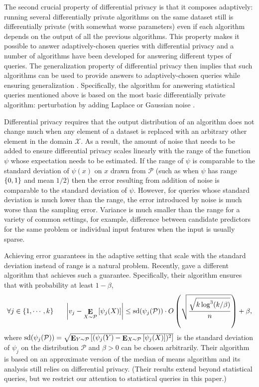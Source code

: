 \documentclass[final,12pt]{colt2018}
\newcommand{\ex}[2]{{\ifx&#1& \E \else \E_{#1} \fi \left[#2\right]}}
\newcommand{\sdv}{\mathop{\mathrm{sd}}}
\providecommand\X{\mathcal{X}}
\providecommand{\cP}{{\mathcal P}}
\begin{document}
The second crucial property of differential privacy is that it composes adaptively: running several differentially private algorithms on the same dataset still is differentially private (with somewhat worse parameters) even if each algorithm depends on the output of all the previous algorithms. This property makes it possible to answer adaptively-chosen queries with differential privacy and a number of algorithms have been developed for answering different types of queries. The generalization property of differential privacy then implies that such algorithms can be used to provide answers to adaptively-chosen queries while ensuring generalization \citep{DworkFHPRR14:arxiv}. Specifically, the algorithm for answering statistical queries mentioned above is based on the most basic differentially private algorithm: perturbation by adding Laplace or Gaussian noise \citep{DworkMNS:06}.

Differential privacy requires that the output distribution of an algorithm does not change much when any element of a dataset is replaced with an arbitrary other element in the domain $\X$. As a result, the amount of noise that needs to be added to ensure differential privacy scales linearly with the range of the function $\psi$ whose expectation needs to be estimated. If the range of $\psi$ is comparable to the standard deviation of $\psi(x)$ on $x$ drawn from $\cP$ (such as when $\psi$ has range $\{0,1\}$ and mean $1/2$) then the error resulting from addition of noise is comparable to the standard deviation of $\psi$. However, for queries whose standard deviation is much lower than the range, the error introduced by noise is much worse than the sampling error. Variance is much smaller than the range for a variety of common settings, for example, difference between candidate predictors for the same problem or individual input features when the input is usually sparse.

Achieving error guarantees in the adaptive setting that scale with the standard deviation instead of range is a natural problem. Recently, \citet{FeldmanS17}
gave a different algorithm that achieves such a guarantee. Specifically, their algorithm ensures that with probability at least $1-\beta$, \begin{equation}\forall j \in \{1, \cdots, k\} ~~~~~ \left| v_j - \ex{X \sim \cP}{\psi_j(X)} \right| \leq \sdv(\psi_j(\cP)) \cdot O \left( \sqrt{\frac{\sqrt{k \log^3 (k/\beta)}}{n}} \right) + \beta,\label{eqn:sdv}\end{equation} where $\sdv(\psi_j(\cP)) = \sqrt{\ex{Y \sim \cP}{(\psi_j(Y)-\ex{X \sim \cP}{\psi_j(X)})^2}}$ is the standard deviation of $\psi_j$ on the distribution $\cP$ and $\beta>0$ can be chosen arbitrarily.
Their algorithm is based on an approximate version of the median of means algorithm and its analysis still relies on differential privacy. (Their results extend beyond statistical queries, but we restrict our attention to statistical queries in this paper.)
\end{document}
